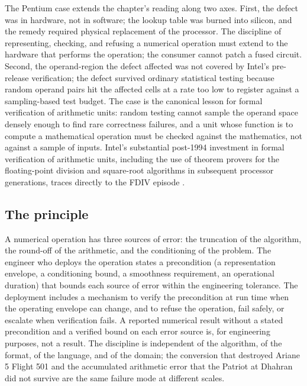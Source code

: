 The Pentium case extends the chapter's reading along two axes.
First, the defect was in hardware, not in software; the lookup
table was burned into silicon, and the remedy required physical
replacement of the processor. The discipline of representing,
checking, and refusing a numerical operation must extend to the
hardware that performs the operation; the consumer cannot patch
a fused circuit. Second, the operand-region the defect affected was
not covered by Intel's pre-release verification; the defect
survived ordinary statistical testing because random operand pairs
hit the affected cells at a rate too low to register against a
sampling-based test budget. The case is the canonical lesson for
formal verification of arithmetic units: random testing cannot
sample the operand space densely enough to find rare
correctness failures, and a unit whose function is to compute a
mathematical operation must be checked against the mathematics, not
against a sample of inputs. Intel's substantial post-1994 investment
in formal verification of arithmetic units, including the use of
theorem provers for the floating-point division and square-root
algorithms in subsequent processor generations, traces directly to
the FDIV episode \cite{paper:edelman-1997}.

\subsection{The principle}

\begin{principle}
A numerical operation has three sources of error: the truncation
of the algorithm, the round-off of the arithmetic, and the
conditioning of the problem. The engineer who deploys the
operation states a precondition (a representation envelope, a
conditioning bound, a smoothness requirement, an operational
duration) that bounds each source of error within the engineering
tolerance. The deployment includes a mechanism to verify the
precondition at run time when the operating envelope can change,
and to refuse the operation, fail safely, or escalate when
verification fails. A reported numerical result without a stated
precondition and a verified bound on each error source is, for
engineering purposes, not a result. The discipline is independent
of the algorithm, of the format, of the language, and of the
domain; the conversion that destroyed Ariane 5 Flight 501 and
the accumulated arithmetic error that the Patriot at Dhahran did
not survive are the same failure mode at different scales.
\end{principle}

